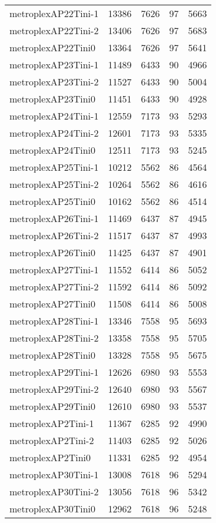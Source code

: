 \begin{longtable}{lrrrr}
metroplexAP22Tini-1 & 13386 & 7626 & 97 & 5663 \\
metroplexAP22Tini-2 & 13406 & 7626 & 97 & 5683 \\
metroplexAP22Tini0 & 13364 & 7626 & 97 & 5641 \\
metroplexAP23Tini-1 & 11489 & 6433 & 90 & 4966 \\
metroplexAP23Tini-2 & 11527 & 6433 & 90 & 5004 \\
metroplexAP23Tini0 & 11451 & 6433 & 90 & 4928 \\
metroplexAP24Tini-1 & 12559 & 7173 & 93 & 5293 \\
metroplexAP24Tini-2 & 12601 & 7173 & 93 & 5335 \\
metroplexAP24Tini0 & 12511 & 7173 & 93 & 5245 \\
metroplexAP25Tini-1 & 10212 & 5562 & 86 & 4564 \\
metroplexAP25Tini-2 & 10264 & 5562 & 86 & 4616 \\
metroplexAP25Tini0 & 10162 & 5562 & 86 & 4514 \\
metroplexAP26Tini-1 & 11469 & 6437 & 87 & 4945 \\
metroplexAP26Tini-2 & 11517 & 6437 & 87 & 4993 \\
metroplexAP26Tini0 & 11425 & 6437 & 87 & 4901 \\
metroplexAP27Tini-1 & 11552 & 6414 & 86 & 5052 \\
metroplexAP27Tini-2 & 11592 & 6414 & 86 & 5092 \\
metroplexAP27Tini0 & 11508 & 6414 & 86 & 5008 \\
metroplexAP28Tini-1 & 13346 & 7558 & 95 & 5693 \\
metroplexAP28Tini-2 & 13358 & 7558 & 95 & 5705 \\
metroplexAP28Tini0 & 13328 & 7558 & 95 & 5675 \\
metroplexAP29Tini-1 & 12626 & 6980 & 93 & 5553 \\
metroplexAP29Tini-2 & 12640 & 6980 & 93 & 5567 \\
metroplexAP29Tini0 & 12610 & 6980 & 93 & 5537 \\
metroplexAP2Tini-1 & 11367 & 6285 & 92 & 4990 \\
metroplexAP2Tini-2 & 11403 & 6285 & 92 & 5026 \\
metroplexAP2Tini0 & 11331 & 6285 & 92 & 4954 \\
metroplexAP30Tini-1 & 13008 & 7618 & 96 & 5294 \\
metroplexAP30Tini-2 & 13056 & 7618 & 96 & 5342 \\
metroplexAP30Tini0 & 12962 & 7618 & 96 & 5248 \\

\end{longtable}

